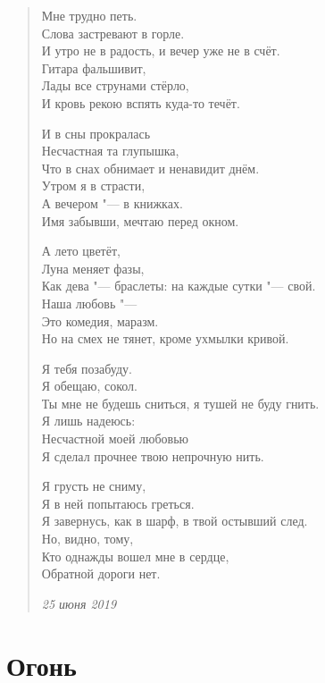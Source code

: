 \documentclass[a4paper,12pt]{article}
\begin{document}
\begin{verse}
Мне трудно петь.\\
Слова застревают в горле.\\
И утро не в радость, и вечер уже не в счёт.\\
Гитара фальшивит,\\
Лады все струнами стёрло,\\
И кровь рекою вспять куда-то течёт.

И в сны прокралась\\
Несчастная та глупышка,\\
Что в снах обнимает и ненавидит днём.\\
Утром я в страсти,\\
А вечером "--- в книжках.\\
Имя забывши, мечтаю перед окном.

А лето цветёт,\\
Луна меняет фазы,\\
Как дева "--- браслеты: на каждые сутки "--- свой.\\
Наша любовь "---\\
Это комедия, маразм.\\
Но на смех не тянет, кроме ухмылки кривой.

Я тебя позабуду.\\
Я обещаю, сокол.\\
Ты мне не будешь сниться, я тушей не буду гнить.\\
Я лишь надеюсь:\\
Несчастной моей любовью\\
Я сделал прочнее твою непрочную нить.

Я грусть не сниму,\\
Я в ней попытаюсь греться.\\
Я завернусь, как в шарф, в твой остывший след.\\
Но, видно, тому,\\
Кто однажды вошел мне в сердце,\\
Обратной дороги нет.

\emph{25 июня 2019}
\end{verse}
\newpage

\section{Огонь}
\end{document}
